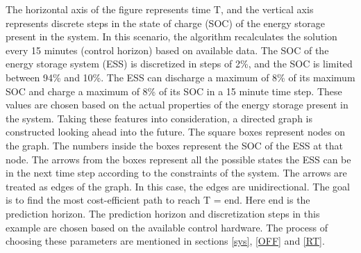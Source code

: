 {The horizontal axis of the figure represents time T, and the vertical axis represents discrete steps in the state of charge (SOC) of the energy storage present in the system. In this scenario, the algorithm recalculates the solution every 15 minutes (control horizon) based on available data. The SOC of the energy storage system (ESS) is discretized in steps of 2\%, and the SOC is limited between 94\% and 10\%. The ESS can discharge a maximum of 8\% of its maximum SOC and charge a maximum of 8\% of its SOC in a 15 minute time step. These values are chosen based on the actual properties of the energy storage present in the system. Taking these features into consideration, a directed graph is constructed looking ahead into the future. The square boxes represent nodes on the graph. The numbers inside the boxes represent the SOC of the ESS at that node. The arrows from the boxes represent all the possible states the ESS can be in the next time step according to the constraints of the system. The arrows are treated as edges of the graph. In this case, the edges are unidirectional. The goal is to find the most cost-efficient path to reach T = end. Here end is the prediction horizon. The prediction horizon and discretization steps in this example are chosen based on the available control hardware. The process of choosing these parameters are mentioned in sections \ref{sys}, \ref{OFF} and \ref{RT}.}



